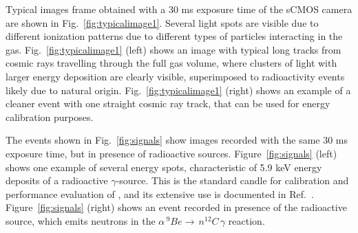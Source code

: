 \documentclass[12pt]{iopart}
\begin{document}
Typical images frame obtained with a 30 ms exposure time of the sCMOS
camera are shown in Fig.~\ref{fig:typicalimage1}. Several light spots
are visible due to different ionization patterns due to different types of particles interacting in the
gas.   Fig.~\ref{fig:typicalimage1} (left) shows an
image with typical long tracks from cosmic rays travelling through the
full gas volume, where clusters of light with larger  energy deposition are
clearly visible, superimposed to  radioactivity events likely due to natural origin.
Fig.~\ref{fig:typicalimage1} (right) shows an example of a cleaner event
with one straight cosmic ray track, that can be used for energy
calibration purposes.

The events shown in Fig.~\ref{fig:signals} show images recorded with
the same 30 ms exposure time, but in presence of radioactive
sources. Figure~\ref{fig:signals} (left) shows one example of several
energy spots, characteristic of 5.9 keV energy deposits of a  \fe
radioactive $\gamma$-source.  This is the standard candle for calibration and
performance evaluation of \lemon, and its extensive use is documented in
Ref.~\cite{bib:fe55}. Figure~\ref{fig:signals} (right) shows an event
recorded in presence of the \ambe radioactive source, which emits neutrons in the 
$\alpha \, ^{9}Be \rightarrow \, n ^{12}C  \, \gamma$ reaction. 
\end{document}
